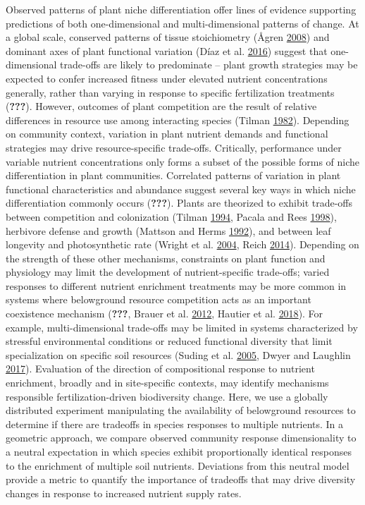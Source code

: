 \documentclass[twoside,12pt,final]{ucthesis-CA2012}
\begin{document}
\begin{ucmainmatter}
Observed patterns of plant niche differentiation offer lines of evidence supporting predictions of both one-dimensional and multi-dimensional patterns of change. At a global scale, conserved patterns of tissue stoichiometry (Ågren \protect\hyperlink{ref-Agren2008}{2008}) and dominant axes of plant functional variation (Díaz et al. \protect\hyperlink{ref-Diaz2016}{2016}) suggest that one-dimensional trade-offs are likely to predominate -- plant growth strategies may be expected to confer increased fitness under elevated nutrient concentrations generally, rather than varying in response to specific fertilization treatments ({\textbf{???}}).
However, outcomes of plant competition are the result of relative differences in resource use among interacting species (Tilman \protect\hyperlink{ref-tilman1982resource}{1982}).
Depending on community context, variation in plant nutrient demands and functional strategies may drive resource-specific trade-offs.
Critically, performance under variable nutrient concentrations only forms a subset of the possible forms of niche differentiation in plant communities. Correlated patterns of variation in plant functional characteristics and abundance suggest several key ways in which niche differentiation commonly occurs ({\textbf{???}}).
Plants are theorized to exhibit trade-offs between competition and colonization (Tilman \protect\hyperlink{ref-Tilman1994}{1994}, Pacala and Rees \protect\hyperlink{ref-Pacala1998}{1998}), herbivore defense and growth (Mattson and Herms \protect\hyperlink{ref-Mattson1992}{1992}), and between leaf longevity and photosynthetic rate (Wright et al. \protect\hyperlink{ref-Wright2004}{2004}, Reich \protect\hyperlink{ref-Reich2014}{2014}).
Depending on the strength of these other mechanisms, constraints on plant function and physiology may limit the development of nutrient-specific trade-offs; varied responses to different nutrient enrichment treatments may be more common in systems where belowground resource competition acts as an important coexistence mechanism ({\textbf{???}}, Brauer et al. \protect\hyperlink{ref-Brauer2012}{2012}, Hautier et al. \protect\hyperlink{ref-Hautier2018}{2018}).
For example, multi-dimensional trade-offs may be limited in systems characterized by stressful environmental conditions or reduced functional diversity that limit specialization on specific soil resources (Suding et al. \protect\hyperlink{ref-Suding2005}{2005}, Dwyer and Laughlin \protect\hyperlink{ref-Dwyer2017}{2017}).
Evaluation of the direction of compositional response to nutrient enrichment, broadly and in site-specific contexts, may identify mechanisms responsible fertilization-driven biodiversity change.
Here, we use a globally distributed experiment manipulating the availability of belowground resources to determine if there are tradeoffs in species responses to multiple nutrients.
In a geometric approach, we compare observed community response dimensionality to a neutral expectation in which species exhibit proportionally identical responses to the enrichment of multiple soil nutrients.
Deviations from this neutral model provide a metric to quantify the importance of tradeoffs that may drive diversity changes in response to increased nutrient supply rates.


\end{ucmainmatter}
\end{document}
